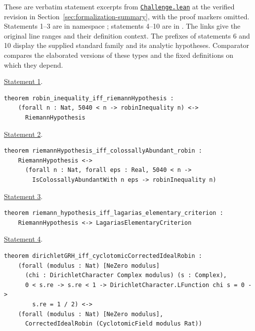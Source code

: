 \documentclass[11pt]{amsart}
\theoremstyle{definition}
\theoremstyle{remark}
\numberwithin{equation}{section}
\newcommand{\repositoryurl}{https://github.com/kimihiro64/Robin1984}
\newcommand{\proofrevision}{b359826e62c50b6cef55db4b2fcab793232498cc}
\newcommand{\codefile}[1]{%
  \href{\repositoryurl/blob/\proofrevision/#1}{\nolinkurl{#1}}}
\begin{document}
These are verbatim statement excerpts from \codefile{Challenge.lean}
at the verified revision in Section~\ref{sec:formalization-summary},
with the proof markers omitted. Statements 1--3 are in namespace
; statements 4--10 are in .
The links give the original line ranges and their definition context.
The prefixes of statements 6 and 10 display the supplied standard
family and its analytic hypotheses. Comparator compares the elaborated
versions of these types and the fixed definitions on which they depend.

{\footnotesize
\noindent\begin{minipage}{\linewidth}
\noindent\href{\repositoryurl/blob/\proofrevision/Challenge.lean\#L201-L203}{Statement 1}.
\begin{verbatim}
theorem robin_inequality_iff_riemannHypothesis :
    (forall n : Nat, 5040 < n -> robinInequality n) <->
      RiemannHypothesis
\end{verbatim}
\end{minipage}\par\smallskip

\noindent\begin{minipage}{\linewidth}
\noindent\href{\repositoryurl/blob/\proofrevision/Challenge.lean\#L209-L212}{Statement 2}.
\begin{verbatim}
theorem riemannHypothesis_iff_colossallyAbundant_robin :
    RiemannHypothesis <->
      (forall n : Nat, forall eps : Real, 5040 < n ->
        IsColossallyAbundantWith n eps -> robinInequality n)
\end{verbatim}
\end{minipage}\par\smallskip

\noindent\begin{minipage}{\linewidth}
\noindent\href{\repositoryurl/blob/\proofrevision/Challenge.lean\#L218-L219}{Statement 3}.
\begin{verbatim}
theorem riemann_hypothesis_iff_lagarias_elementary_criterion :
    RiemannHypothesis <-> LagariasElementaryCriterion
\end{verbatim}
\end{minipage}\par\smallskip

\noindent\begin{minipage}{\linewidth}
\noindent\href{\repositoryurl/blob/\proofrevision/Challenge.lean\#L233-L239}{Statement 4}.
\begin{verbatim}
theorem dirichletGRH_iff_cyclotomicCorrectedIdealRobin :
    (forall (modulus : Nat) [NeZero modulus]
      (chi : DirichletCharacter Complex modulus) (s : Complex),
      0 < s.re -> s.re < 1 -> DirichletCharacter.LFunction chi s = 0 ->
        s.re = 1 / 2) <->
    (forall (modulus : Nat) [NeZero modulus],
      CorrectedIdealRobin (CyclotomicField modulus Rat))
\end{verbatim}
\end{minipage}\par\smallskip

}
\end{document}
